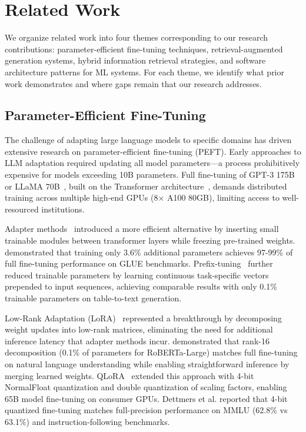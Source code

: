 \documentclass[pdflatex,sn-basic]{sn-jnl}
\begin{document}
\section{Related Work}
\label{sec:related-work}

We organize related work into four themes corresponding to our research contributions: parameter-efficient fine-tuning techniques, retrieval-augmented generation systems, hybrid information retrieval strategies, and software architecture patterns for ML systems. For each theme, we identify what prior work demonstrates and where gaps remain that our research addresses.

\subsection{Parameter-Efficient Fine-Tuning}
\label{sec:related-peft}

The challenge of adapting large language models to specific domains has driven extensive research on parameter-efficient fine-tuning (PEFT). Early approaches to LLM adaptation required updating all model parameters—a process prohibitively expensive for models exceeding 10B parameters. Full fine-tuning of GPT-3 175B~\citep{brown2020gpt3} or LLaMA 70B~\citep{touvron2023llama}, built on the Transformer architecture~\citep{vaswani2017attention}, demands distributed training across multiple high-end GPUs (8× A100 80GB), limiting access to well-resourced institutions.

Adapter methods~\citep{houlsby2019adapters} introduced a more efficient alternative by inserting small trainable modules between transformer layers while freezing pre-trained weights. \cite{houlsby2019adapters} demonstrated that training only 3.6\% additional parameters achieves 97-99\% of full fine-tuning performance on GLUE benchmarks. Prefix-tuning~\citep{li2021prefix} further reduced trainable parameters by learning continuous task-specific vectors prepended to input sequences, achieving comparable results with only 0.1\% trainable parameters on table-to-text generation.

Low-Rank Adaptation (LoRA)~\citep{hu2022lora} represented a breakthrough by decomposing weight updates into low-rank matrices, eliminating the need for additional inference latency that adapter methods incur. \cite{hu2022lora} demonstrated that rank-16 decomposition (0.1\% of parameters for RoBERTa-Large) matches full fine-tuning on natural language understanding while enabling straightforward inference by merging learned weights. QLoRA~\citep{dettmers2023qlora} extended this approach with 4-bit NormalFloat quantization and double quantization of scaling factors, enabling 65B model fine-tuning on consumer GPUs. Dettmers et al. reported that 4-bit quantized fine-tuning matches full-precision performance on MMLU (62.8\% vs 63.1\%) and instruction-following benchmarks.
\end{document}
